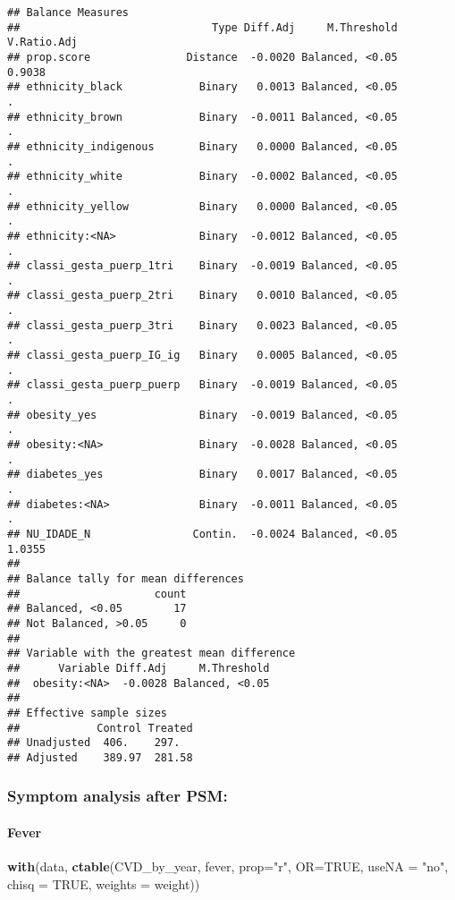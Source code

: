 \documentclass[
]{article}
\newenvironment{Shaded}{\begin{snugshade}}{\end{snugshade}}
\newcommand{\AttributeTok}[1]{\textcolor[rgb]{0.13,0.29,0.53}{#1}}
\newcommand{\ConstantTok}[1]{\textcolor[rgb]{0.56,0.35,0.01}{#1}}
\newcommand{\FunctionTok}[1]{\textcolor[rgb]{0.13,0.29,0.53}{\textbf{#1}}}
\newcommand{\NormalTok}[1]{#1}
\newcommand{\StringTok}[1]{\textcolor[rgb]{0.31,0.60,0.02}{#1}}
\begin{document}
\begin{verbatim}
## Balance Measures
##                              Type Diff.Adj     M.Threshold V.Ratio.Adj
## prop.score               Distance  -0.0020 Balanced, <0.05      0.9038
## ethnicity_black            Binary   0.0013 Balanced, <0.05           .
## ethnicity_brown            Binary  -0.0011 Balanced, <0.05           .
## ethnicity_indigenous       Binary   0.0000 Balanced, <0.05           .
## ethnicity_white            Binary  -0.0002 Balanced, <0.05           .
## ethnicity_yellow           Binary   0.0000 Balanced, <0.05           .
## ethnicity:<NA>             Binary  -0.0012 Balanced, <0.05           .
## classi_gesta_puerp_1tri    Binary  -0.0019 Balanced, <0.05           .
## classi_gesta_puerp_2tri    Binary   0.0010 Balanced, <0.05           .
## classi_gesta_puerp_3tri    Binary   0.0023 Balanced, <0.05           .
## classi_gesta_puerp_IG_ig   Binary   0.0005 Balanced, <0.05           .
## classi_gesta_puerp_puerp   Binary  -0.0019 Balanced, <0.05           .
## obesity_yes                Binary  -0.0019 Balanced, <0.05           .
## obesity:<NA>               Binary  -0.0028 Balanced, <0.05           .
## diabetes_yes               Binary   0.0017 Balanced, <0.05           .
## diabetes:<NA>              Binary  -0.0011 Balanced, <0.05           .
## NU_IDADE_N                Contin.  -0.0024 Balanced, <0.05      1.0355
## 
## Balance tally for mean differences
##                     count
## Balanced, <0.05        17
## Not Balanced, >0.05     0
## 
## Variable with the greatest mean difference
##      Variable Diff.Adj     M.Threshold
##  obesity:<NA>  -0.0028 Balanced, <0.05
## 
## Effective sample sizes
##            Control Treated
## Unadjusted  406.    297.  
## Adjusted    389.97  281.58
\end{verbatim}

\hypertarget{symptom-analysis-after-psm}{%
\subsubsection{Symptom analysis after
PSM:}\label{symptom-analysis-after-psm}}

\hypertarget{fever-1}{%
\paragraph{\texorpdfstring{{ Fever }}{ Fever }}\label{fever-1}}

\begin{Shaded}
\begin{Highlighting}[]
\FunctionTok{with}\NormalTok{(data, }\FunctionTok{ctable}\NormalTok{(CVD\_by\_year, fever, }\AttributeTok{prop=}\StringTok{"r"}\NormalTok{, }\AttributeTok{OR=}\ConstantTok{TRUE}\NormalTok{, }\AttributeTok{useNA =} \StringTok{"no"}\NormalTok{, }\AttributeTok{chisq =} \ConstantTok{TRUE}\NormalTok{, }\AttributeTok{weights =}\NormalTok{ weight))}
\end{Highlighting}
\end{Shaded}
\end{document}
